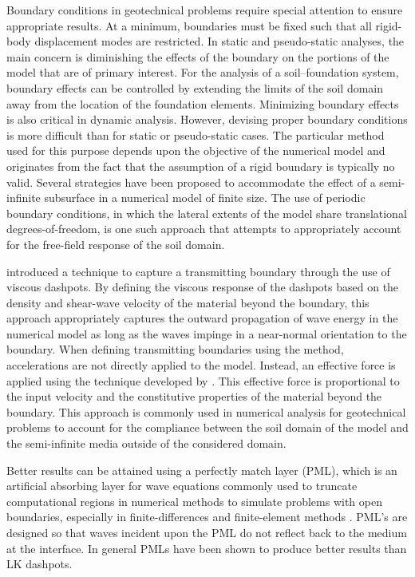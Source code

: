 Boundary conditions in geotechnical problems require special attention to ensure appropriate results. At a minimum, boundaries must be ﬁxed such that all rigid-body displacement modes are restricted. In static and pseudo-static analyses, the main concern is diminishing the eﬀects of the boundary on the portions of the model that are of primary interest. For the analysis of a soil–foundation system, boundary eﬀects can be controlled by extending the limits of the soil domain away from the location of the foundation elements. Minimizing boundary eﬀects is also critical in dynamic analysis. However, devising proper boundary conditions is more diﬃcult than for static or pseudo-static cases. The particular method used for this purpose depends upon the objective of the numerical model and originates from the fact that the assumption of a rigid boundary is typically no valid. Several strategies have been proposed to accommodate the eﬀect of a semi-inﬁnite subsurface in a numerical model of ﬁnite size. The use of periodic boundary conditions, in which the lateral extents of the model share translational degrees-of-freedom, is one such approach that attempts to appropriately account for the free-ﬁeld response of the soil domain. 

\cite{Lysmer69} introduced a technique to capture a transmitting boundary through the use of viscous dashpots. By deﬁning the viscous response of the dashpots based on the density and shear-wave velocity of the material beyond the boundary, this approach appropriately captures the outward propagation of wave energy in the numerical model as long as the waves impinge in a near-normal orientation to the boundary. When deﬁning transmitting boundaries using the \cite{Lysmer69} method, accelerations are not directly applied to the model. Instead, an effective force is applied using the technique developed by \cite{Joyner75}. This effective force is proportional to the input velocity and the constitutive properties of the material beyond the boundary. This approach is commonly used in numerical analysis for geotechnical problems to account for the compliance between the soil domain of the model and the semi-inﬁnite media outside of the considered domain.

Better results can be attained using a perfectly match layer (PML), which is an artificial absorbing layer for wave equations commonly used to truncate computational regions in numerical methods to simulate problems with open boundaries, especially in finite-differences and finite-element methods \citep{Zhang19}. PML’s are designed so that waves incident upon the PML do not reflect back to the medium at the interface. In general PMLs have been shown to produce better results than LK dashpots.

